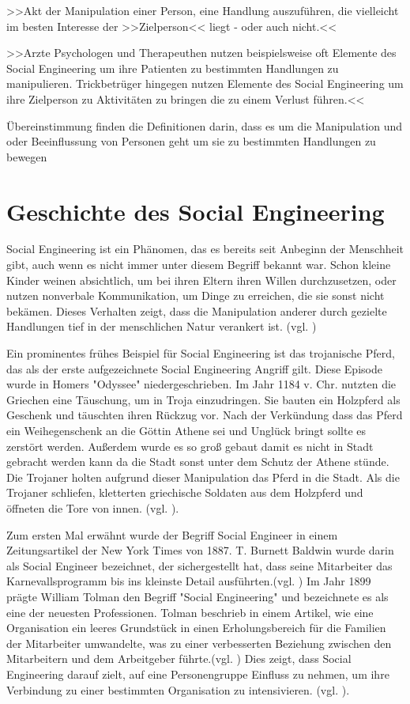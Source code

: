 >>Akt der Manipulation einer Person, eine Handlung auszuführen, die vielleicht im besten Interesse der >>Zielperson<< liegt - oder auch nicht.<<\cite{Hadn1}

>>Arzte Psychologen und Therapeuthen nutzen beispielsweise oft Elemente des Social Engineering um ihre Patienten zu bestimmten Handlungen zu manipulieren. Trickbetrüger hingegen nutzen Elemente des Social Engineering um ihre Zielperson zu Aktivitäten zu bringen die zu einem Verlust führen.<< \cite{Hadn1}

Übereinstimmung finden die Definitionen darin, dass es um die Manipulation und oder Beeinflussung von Personen geht um sie zu bestimmten Handlungen zu bewegen   


\section{Geschichte des Social Engineering}

Social Engineering ist ein Phänomen, das es bereits seit Anbeginn der Menschheit gibt, auch wenn es nicht immer unter diesem Begriff bekannt war. Schon kleine Kinder weinen absichtlich, um bei ihren Eltern ihren Willen durchzusetzen, oder nutzen nonverbale Kommunikation, um Dinge zu erreichen, die sie sonst nicht bekämen. Dieses Verhalten zeigt, dass die Manipulation anderer durch gezielte Handlungen tief in der menschlichen Natur verankert ist. (vgl. \cite{SEinNaturdesMenschverankert})

Ein prominentes frühes Beispiel für Social Engineering ist das trojanische Pferd, das als der erste aufgezeichnete Social Engineering Angriff gilt. Diese Episode wurde in Homers "Odyssee" niedergeschrieben. Im Jahr 1184 v. Chr. nutzten die Griechen eine Täuschung, um in Troja einzudringen. Sie bauten ein Holzpferd als Geschenk und täuschten ihren Rückzug vor. Nach der Verkündung dass das Pferd ein Weihegenschenk an die Göttin Athene sei und Unglück bringt sollte es zerstört werden. Außerdem wurde es so groß gebaut damit es nicht in Stadt gebracht werden kann da die Stadt sonst unter dem Schutz der Athene stünde. Die Trojaner holten aufgrund dieser Manipulation das Pferd in die Stadt. Als die Trojaner schliefen, kletterten griechische Soldaten aus dem Holzpferd und öffneten die Tore von innen. (vgl. \cite{troja}).

Zum ersten Mal erwähnt wurde der Begriff Social Engineer in einem Zeitungsartikel der New York Times von 1887. T. Burnett Baldwin wurde darin als Social Engineer bezeichnet, der sichergestellt hat, dass seine Mitarbeiter das Karnevallsprogramm bis ins kleinste Detail ausführten.(vgl. \cite{nytimes1}) Im Jahr 1899 prägte William Tolman den Begriff "Social Engineering" und bezeichnete es als eine der neuesten Professionen. Tolman beschrieb in einem Artikel, wie eine Organisation ein leeres Grundstück in einen Erholungsbereich für die Familien der Mitarbeiter umwandelte, was zu einer verbesserten Beziehung zwischen den Mitarbeitern und dem Arbeitgeber führte.(vgl. \cite{nytimes2}) Dies zeigt, dass Social Engineering darauf zielt, auf eine Personengruppe Einfluss zu nehmen, um ihre Verbindung zu einer bestimmten Organisation zu intensivieren. (vgl. \cite{hist1}).

